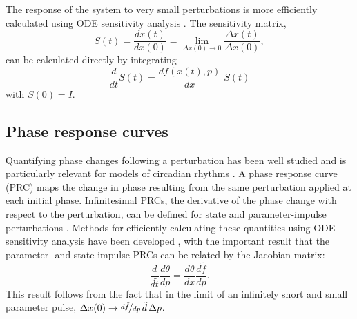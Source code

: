 The response of the system to very small perturbations is more efficiently calculated using ODE sensitivity analysis \cite{Rabitz1983}.
The sensitivity matrix,
\begin{equation}
  S(t) = \frac{dx(t)}{dx(0)} = \lim_{\Delta x(0) \to 0}\frac{\Delta x(t)}{\Delta x(0)},
  \label{eq:senslimit}
\end{equation}
can be calculated directly by integrating
\begin{equation}
  \frac{d}{dt} S(t)  = \frac{df(x(t),p)}{dx}\; S(t)
  \label{eq:odesens}
\end{equation}
with $S(0) = I$.

\subsection{Phase response curves}
Quantifying phase changes following a perturbation has been well studied and is particularly relevant for models of circadian rhythms \cite{Kramer1984, Taylor2008a}.
A phase response curve (PRC) maps the change in phase resulting from the same perturbation applied at each initial phase.
Infinitesimal PRCs, the derivative of the phase change with respect to the perturbation, can be defined for state and parameter-impulse perturbations \cite{Taylor2008a}.
Methods for efficiently calculating these quantities using ODE sensitivity analysis have been developed \cite{Taylor2008a}, with the important result that the parameter- and state-impulse PRCs can be related by the Jacobian matrix:
\begin{equation}
  \frac{d}{d\tilde{t}}\frac{d\theta}{dp} = \frac{d\theta}{dx}\frac{d\tilde{f}}{dp}.
  \label{eq:pPRCequiv}
\end{equation}
This result follows from the fact that in the limit of an infinitely short and small parameter pulse, $\Delta x(0) \to \nicefrac{d\tilde{f}}{dp}\,\tilde{d}\, \Delta p$.

